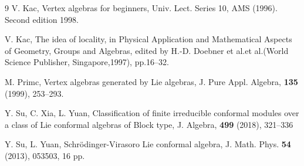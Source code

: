 \documentclass[12pt]{amsart}
\begin{document}
\begin{thebibliography}{9}
 V. Kac,  Vertex algebras for beginners, Univ. Lect. Series 10, AMS
(1996). Second edition 1998.


V. Kac, The idea of locality, in Physical Application and Mathematical Aspects of Geometry, Groups and Algebras, edited
by H.-D. Doebner et al.et al.(World Science Publisher, Singapore,1997), pp.16--32.




 M. Primc, Vertex algebras generated by Lie algebras, J. Pure Appl. Algebra, {\bf 135} (1999), 253--293.




   Y. Su, C. Xia, L. Yuan, Classification of finite irreducible conformal modules over a class of Lie conformal algebras of Block type, J. Algebra, {\bf 499} (2018), 321--336

  Y. Su, L. Yuan, Schr\"odinger-Virasoro Lie conformal algebra, J. Math. Phys. {\bf 54} (2013), 053503, 16 pp.



\end{thebibliography}
\end{document}
